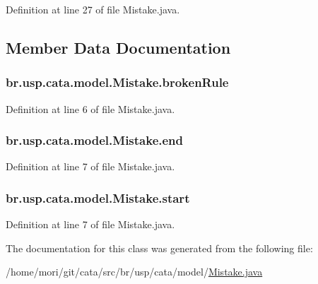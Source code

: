 Definition at line 27 of file Mistake.\+java.



\subsection{Member Data Documentation}
\hypertarget{classbr_1_1usp_1_1cata_1_1model_1_1_mistake_a1688b622b2a1dd1fbf721d60f2068e8e}{
\subsubsection[{broken\+Rule}]{ br.\+usp.\+cata.\+model.\+Mistake.\+broken\+Rule\hspace{0.3cm}{\ttfamily [private]}}}\label{classbr_1_1usp_1_1cata_1_1model_1_1_mistake_a1688b622b2a1dd1fbf721d60f2068e8e}


Definition at line 6 of file Mistake.\+java.

\hypertarget{classbr_1_1usp_1_1cata_1_1model_1_1_mistake_ad4a5a2ff754635480d61cb36cfc7ba84}{
\subsubsection[{end}]{ br.\+usp.\+cata.\+model.\+Mistake.\+end\hspace{0.3cm}{\ttfamily [package]}}}\label{classbr_1_1usp_1_1cata_1_1model_1_1_mistake_ad4a5a2ff754635480d61cb36cfc7ba84}


Definition at line 7 of file Mistake.\+java.

\hypertarget{classbr_1_1usp_1_1cata_1_1model_1_1_mistake_adccd7b64157ac80692f545a07ae2da56}{
\subsubsection[{start}]{ br.\+usp.\+cata.\+model.\+Mistake.\+start\hspace{0.3cm}{\ttfamily [private]}}}\label{classbr_1_1usp_1_1cata_1_1model_1_1_mistake_adccd7b64157ac80692f545a07ae2da56}


Definition at line 7 of file Mistake.\+java.



The documentation for this class was generated from the following file\+:\begin{DoxyCompactItemize}
\item 
/home/mori/git/cata/src/br/usp/cata/model/\hyperlink{_mistake_8java}{Mistake.\+java}\end{DoxyCompactItemize}
